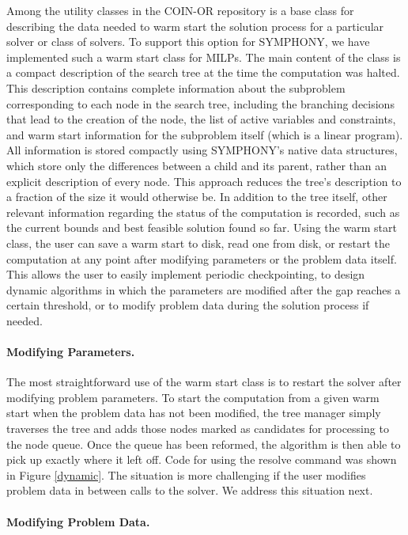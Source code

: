 Among the utility classes in the COIN-OR repository is a base class for
describing the data needed to warm start the solution process for a particular
solver or class of solvers. To support this option for SYMPHONY, we have
implemented such a warm start class for MILPs. The main content of the class
is a compact description of the search tree at the time the computation was
halted. This description contains complete information about the subproblem
corresponding to each node in the search tree, including the branching
decisions that lead to the creation of the node, the list of active variables
and constraints, and warm start information for the subproblem itself (which
is a linear program). All information is stored compactly using SYMPHONY's
native data structures, which store only the differences between a child and
its parent, rather than an explicit description of every node. This approach
reduces the tree's description to a fraction of the size it would otherwise
be. In addition to the tree itself, other relevant information regarding the
status of the computation is recorded, such as the current bounds and best
feasible solution found so far. Using the warm start class, the user can save
a warm start to disk, read one from disk, or restart the computation at any
point after modifying parameters or the problem data itself. This allows
the user to easily implement periodic checkpointing, to design dynamic
algorithms in which the parameters are modified after the gap reaches a
certain threshold, or to modify problem data during the solution process if
needed.

\paragraph{Modifying Parameters.}

The most straightforward use of the warm start class is to restart the solver
after modifying problem parameters. To start the computation from a given warm
start when the problem data has not been modified, the tree manager simply
traverses the tree and adds those nodes marked as candidates for processing to
the node queue. Once the queue has been reformed, the algorithm is then able
to pick up exactly where it left off. Code for using the resolve command was
shown in Figure \ref{dynamic}. The situation is more challenging if the user
modifies problem data in between calls to the solver. We address this
situation next.

\paragraph{Modifying Problem Data.}

